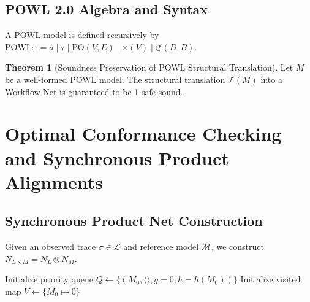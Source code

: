 \documentclass[11pt,a4paper,oneside]{book}
\theoremstyle{definition}
\newtheorem{theorem}{Theorem}[chapter]
\begin{document}
\section{POWL 2.0 Algebra and Syntax}
A POWL model is defined recursively by $\text{POWL} ::= a \mid \tau \mid \text{PO}(V, E) \mid \times(V) \mid \circlearrowleft(D, B)$.

\begin{theorem}[Soundness Preservation of POWL Structural Translation]
Let $M$ be a well-formed POWL model. The structural translation $\mathcal{T}(M)$ into a Workflow Net is guaranteed to be 1-safe sound.
\end{theorem}

\chapter{Optimal Conformance Checking and Synchronous Product Alignments}

\section{Synchronous Product Net Construction}
Given an observed trace $\sigma \in \mathcal{L}$ and reference model $\mathcal{M}$, we construct $N_{L \times M} = N_L \otimes N_M$.

\begin{algorithm}[H]
\SetAlgoLined
{}
Initialize priority queue $Q \leftarrow \{(M_0, \langle \rangle, g=0, h=h(M_0))\}$\;
Initialize visited map $V \leftarrow \{M_0 \mapsto 0\}$\;
\caption{$A^*$ Optimal Alignment Search on Synchronous Product Net}
\end{algorithm}
\end{document}
